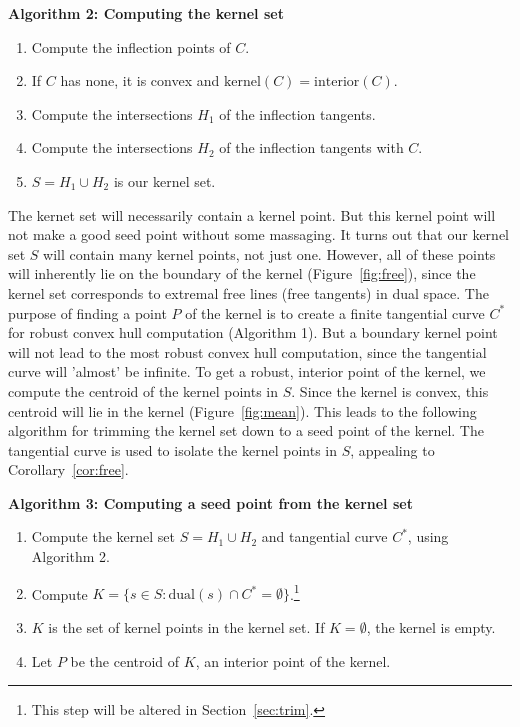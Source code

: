 \documentclass[12pt]{article}
\begin{document}
\vspace{.2in}

\centerline{{\bf Algorithm 2: Computing the kernel set}}

\begin{enumerate}
\item Compute the inflection points of $C$.
\item If $C$ has none, it is convex and $\mbox{kernel}(C) = \mbox{interior}(C)$.
\item Compute the intersections $H_1$ of the inflection tangents.
\item Compute the intersections $H_2$ of the inflection tangents with $C$.
\item $S = H_1 \cup H_2$ is our kernel set.
\end{enumerate}

The kernet set will necessarily contain a kernel point.
But this kernel point will not make a good seed point without some massaging.
It turns out that our kernel set $S$ will contain many kernel points, not just one.
However, 
all of these points will inherently lie on the boundary of the kernel
(Figure~\ref{fig:free}),
since the kernel set corresponds to extremal free lines (free tangents)
in dual space.
The purpose of finding a point $P$ of the kernel is to create
a finite tangential curve $C^*$ for robust convex hull computation (Algorithm 1).
But a boundary kernel point will not 
lead to the most robust convex hull computation,
since the tangential curve will 'almost' be infinite.
To get a robust, interior point of the kernel,
we compute the centroid of the kernel points in $S$.
Since the kernel is convex, this centroid will lie in the kernel 
(Figure~\ref{fig:mean}).
This leads to the following algorithm for
trimming the kernel set down to a seed point of the kernel.
The tangential curve is used to isolate the kernel points in $S$,
appealing to Corollary~\ref{cor:free}.

\vspace{.2in}

\centerline{{\bf Algorithm 3: Computing a seed point from the kernel set}}

\begin{enumerate} 
\item	Compute the kernel set $S = H_1 \cup H_2$  
	and tangential curve $C^*$, using Algorithm 2.
\item	Compute $K = \{s \in S : \mbox{dual}(s) \cap C^* = \emptyset\}$.\footnote{This
		step will be altered in Section~\ref{sec:trim}.}
\item	$K$ is the set of kernel points in the kernel set.
	If $K = \emptyset$, the kernel is empty.
\item	Let $P$ be the centroid of $K$,
	an interior point of the kernel.
\end{enumerate}
\end{document}
